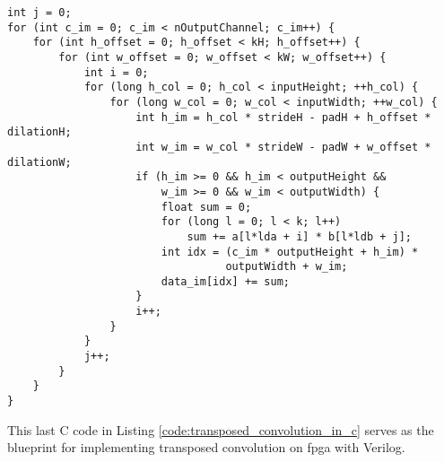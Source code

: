 \begin{code}
\begin{verbatim}
int j = 0;
for (int c_im = 0; c_im < nOutputChannel; c_im++) {
    for (int h_offset = 0; h_offset < kH; h_offset++) {
        for (int w_offset = 0; w_offset < kW; w_offset++) {
            int i = 0;
            for (long h_col = 0; h_col < inputHeight; ++h_col) {
                for (long w_col = 0; w_col < inputWidth; ++w_col) {
                    int h_im = h_col * strideH - padH + h_offset * dilationH;
                    int w_im = w_col * strideW - padW + w_offset * dilationW;
                    if (h_im >= 0 && h_im < outputHeight &&
                        w_im >= 0 && w_im < outputWidth) {
                        float sum = 0;
                        for (long l = 0; l < k; l++)
                            sum += a[l*lda + i] * b[l*ldb + j];
                        int idx = (c_im * outputHeight + h_im) *
                                  outputWidth + w_im;
                        data_im[idx] += sum;
                    }
                    i++;
                }
            }
            j++;
        }
    }
}
\end{verbatim}
\label{code:transposed_convolution_in_c}
\end{code}

This last C code in Listing \ref{code:transposed_convolution_in_c} serves as the blueprint for implementing
transposed convolution on \gls{fpga} with Verilog.

\clearpage %
